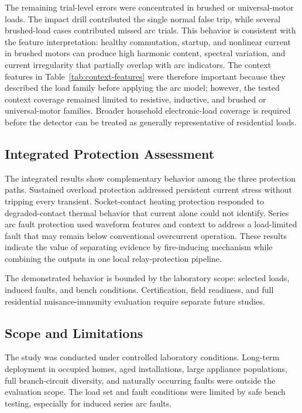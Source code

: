 \documentclass[conference,a4paper]{template/IEEEtran}
\begin{document}
The remaining trial-level errors were concentrated in brushed or
universal-motor loads. The impact drill contributed the single normal
false trip, while several brushed-load cases contributed missed arc
trials. This behavior is consistent with the feature interpretation:
healthy commutation, startup, and nonlinear current in brushed motors can
produce high harmonic content, spectral variation, and current
irregularity that partially overlap with arc indicators. The context
features in Table~\ref{tab:context-features} were therefore important
because they described the load family before applying the arc model;
however, the tested context coverage remained limited to resistive,
inductive, and brushed or universal-motor families. Broader household
electronic-load coverage is required before the detector can be treated
as generally representative of residential loads.

\subsection{Integrated Protection Assessment}

The integrated results show complementary behavior among the three
protection paths. Sustained overload protection addressed persistent
current stress without tripping every transient. Socket-contact heating
protection responded to degraded-contact thermal behavior that current
alone could not identify.
Series arc fault protection used waveform features and context to address a
load-limited fault that may remain below conventional overcurrent
operation. These results indicate the value of separating evidence by
fire-inducing mechanism while combining the outputs in one local
relay-protection pipeline.

The demonstrated behavior is bounded by the laboratory scope: selected
loads, induced faults, and bench conditions. Certification, field
readiness, and full residential nuisance-immunity evaluation require
separate future studies.

\subsection{Scope and Limitations}

The study was conducted under controlled laboratory conditions. Long-term
deployment in occupied homes, aged installations, large appliance
populations, full branch-circuit diversity, and naturally occurring
faults were outside the evaluation scope. The load set and fault
conditions were limited by safe bench testing, especially for induced
series arc faults.
\end{document}
